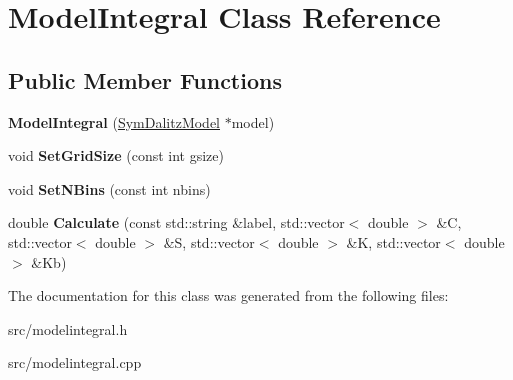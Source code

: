 \hypertarget{class_model_integral}{}\section{Model\+Integral Class Reference}
\label{class_model_integral}
\subsection*{Public Member Functions}
\begin{DoxyCompactItemize}
\item 
\hypertarget{class_model_integral_a9181dd5c7366951aad305c3b997be4a9}{}{\bfseries Model\+Integral} (\hyperlink{class_sym_dalitz_model}{Sym\+Dalitz\+Model} $\ast$model)\label{class_model_integral_a9181dd5c7366951aad305c3b997be4a9}

\item 
\hypertarget{class_model_integral_a36b3713ae191b14a2c1a53a419e0abef}{}void {\bfseries Set\+Grid\+Size} (const int gsize)\label{class_model_integral_a36b3713ae191b14a2c1a53a419e0abef}

\item 
\hypertarget{class_model_integral_af98fedd3d4fd2d32bd8456fc453f11c9}{}void {\bfseries Set\+N\+Bins} (const int nbins)\label{class_model_integral_af98fedd3d4fd2d32bd8456fc453f11c9}

\item 
\hypertarget{class_model_integral_a4b43f47b761347e7d6b929e9f629e199}{}double {\bfseries Calculate} (const std\+::string \&label, std\+::vector$<$ double $>$ \&C, std\+::vector$<$ double $>$ \&S, std\+::vector$<$ double $>$ \&K, std\+::vector$<$ double $>$ \&Kb)\label{class_model_integral_a4b43f47b761347e7d6b929e9f629e199}

\end{DoxyCompactItemize}


The documentation for this class was generated from the following files\+:\begin{DoxyCompactItemize}
\item 
src/modelintegral.\+h\item 
src/modelintegral.\+cpp\end{DoxyCompactItemize}

